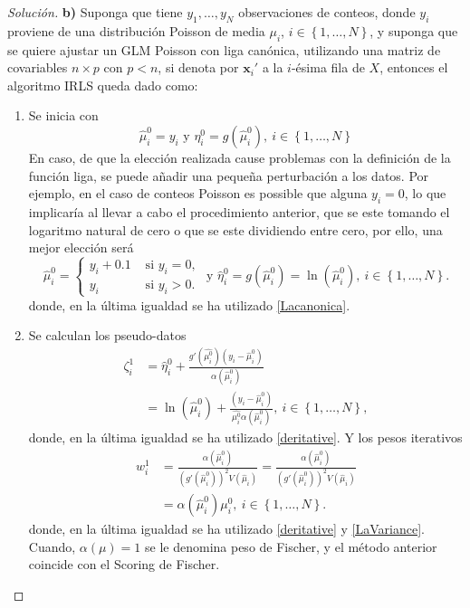 \documentclass[10.5pt,notitlepage]{article}
\newenvironment{solucion}
  {\begin{proof}[Solución]}
  {\end{proof}}
\newcommand{\kis}[1]{\left\{ #1 \right\}}
\theoremstyle{plain}
\begin{document}
\begin{solucion}
\noindent\textbf{b)} Suponga que tiene \(y_1,\hdots,y_N\) observaciones de conteos, donde \(y_i\) proviene de una distribución Poisson de media \(\mu_i\), \(i \in \kis{1, \hdots, N}\), y suponga que se quiere ajustar un GLM Poisson con liga canónica, utilizando una matriz de covariables \(n\times p\) con \(p < n\), si denota por \(\mathbf{x}_i'\) a la \(i\)-ésima fila de \(X\), entonces el algoritmo IRLS queda dado como: 
\begin{enumerate}
    \item Se inicia con 
    \[
    \hat{\mu}^{0}_i = y_i \text{ y } \eta^{0}_i = g(\hat{\mu}^{0}_i), \ i\in\kis{1,\hdots, N}  
    \]
    En caso, de que la elección realizada cause problemas con la definición de la función liga, se puede añadir una pequeña perturbación a los datos. Por ejemplo, en el caso de conteos Poisson es possible que alguna \(y_i = 0\), lo que implicaría al llevar a cabo el procedimiento anterior, que se este tomando el logaritmo natural de cero o que se este dividiendo entre cero, por ello, una mejor elección será 
    \[
    \hat{\mu}^{0}_i =\begin{cases}
     y_i + 0.1 & \text{ si } y_i=  0,\\ 
     y_i & \text{ si } y_i > 0. 
     \end{cases}\text{ y } \hat{\eta}^{0}_i = g(\hat{\mu}^{0}_i) = \ln(\hat{\mu}^{0}_i), \ i\in \kis{1, \hdots, N}.
    \]
    donde, en la última igualdad se ha utilizado \eqref{Lacanonica}. 
    \item Se calculan los pseudo-datos
    \begin{align*}
    \zeta_{i}^{1} &=\hat{\eta}^{0}_i+ \frac{g'(\hat{\mu^{0}_i})(y_i - \hat{\mu}^{0}_i)}{\alpha(\hat{\mu}^0_i)}\\ 
    &= \ln(\hat{\mu}^{0}_i) + \frac{(y_i - \hat{\mu}^{0}_i)}{\hat{\mu^{0}_i}\alpha(\hat{\mu}^0_i)},  \ i\in \kis{1, \hdots, N},
    \end{align*}
    donde, en la última igualdad se ha utilizado \eqref{deritative}. Y los pesos iterativos 
    \begin{align*}
    w_{i}^{1} &= \frac{\alpha(\hat{\mu}^{0}_i)}{(g'(\hat{\mu}^{0}_i))^2V(\hat{\mu}_i)}=\frac{\alpha(\hat{\mu}^{0}_i)}{(g'(\hat{\mu}^{0}_i))^2V(\hat{\mu}_i)}\\
    &=\alpha(\hat{\mu}^{0}_i)\mu^{0}_i,  \ i\in \kis{1, \hdots, N}.
    \end{align*}
   donde, en la última igualdad se ha utilizado \eqref{deritative} y \eqref{LaVariance}. Cuando, \(\alpha(\mu) = 1\) se le denomina peso de Fischer, y el método anterior coincide con el Scoring de Fischer. 

\end{enumerate}
\end{solucion}
\end{document}

